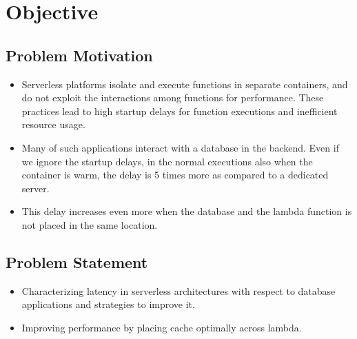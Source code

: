 

\chapter{Objective} %

\label{Chapter 3} %


\section{Problem Motivation}

\begin{itemize}
    \item Serverless platforms isolate and execute functions in separate containers, and do not exploit the interactions among functions for performance. These practices lead to high startup delays for function executions and inefficient resource usage.
    \item Many of such applications interact with a database in the backend. Even if we ignore the startup delays, in the normal executions also when the container is warm, the delay is 5 times more as compared to a dedicated server.
    \item This delay increases even more when the database and the lambda function is not placed in the same location.
\end{itemize}



\section{Problem Statement}

\begin{itemize}
    \item Characterizing latency in serverless architectures with respect to database applications and strategies to improve it.
    \item Improving performance by placing cache optimally across lambda.
\end{itemize}

